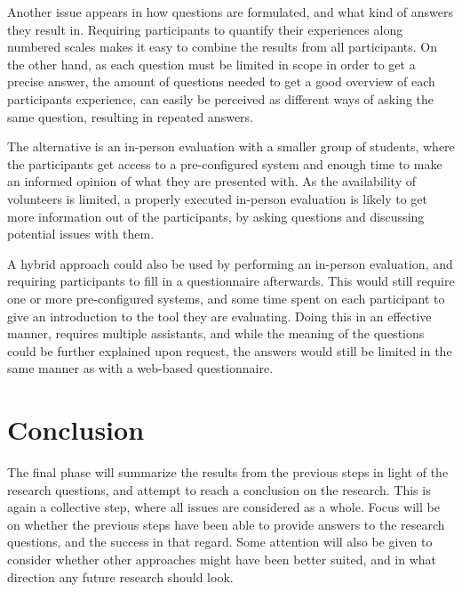 Another issue appears in how questions are formulated, and what kind of answers they result in.
Requiring participants to quantify their experiences along numbered scales makes it easy to combine the results from all participants.
On the other hand, as each question must be limited in scope in order to get a precise answer, the amount of questions needed to get a good overview of each participants experience, can easily be perceived as different ways of asking the same question, resulting in repeated answers.

The alternative is an in-person evaluation with a smaller group of students, where the participants get access to a pre-configured system and enough time to make an informed opinion of what they are presented with.
As the availability of volunteers is limited, a properly executed in-person evaluation is likely to get more information out of the participants, by asking questions and discussing potential issues with them.

A hybrid approach could also be used by performing an in-person evaluation, and requiring participants to fill in a questionnaire afterwards.
This would still require one or more pre-configured systems, and some time spent on each participant to give an introduction to the tool they are evaluating.
Doing this in an effective manner, requires multiple assistants, and while the meaning of the questions could be further explained upon request, the answers would still be limited in the same manner as with a web-based questionnaire.

\section{Conclusion}\label{methConclude}

The final phase will summarize the results from the previous steps in light of the research questions, and attempt to reach a conclusion on the research.
This is again a collective step, where all issues are considered as a whole.
Focus will be on whether the previous steps have been able to provide answers to the research questions, and the success in that regard.
Some attention will also be given to consider whether other approaches might have been better suited, and in what direction any future research should look.









